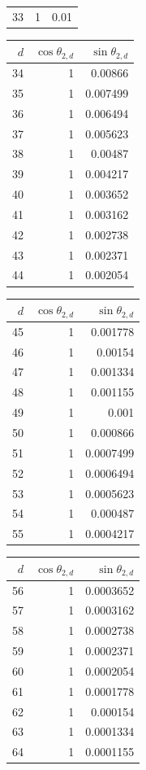 {\begin{tabular}[t]{r|rr}
33 & 1 & 0.01
\end{tabular}\kern4pt
\begin{tabular}[t]{r|rr}
$d$ & $\cos\theta_{2,d}$ & $\sin\theta_{2,d}$ \\\hline
34 & 1 & 0.00866 \\
35 & 1 & 0.007499 \\
36 & 1 & 0.006494 \\
37 & 1 & 0.005623 \\
38 & 1 & 0.00487 \\
39 & 1 & 0.004217 \\
40 & 1 & 0.003652 \\
41 & 1 & 0.003162 \\
42 & 1 & 0.002738 \\
43 & 1 & 0.002371 \\
44 & 1 & 0.002054
\end{tabular}\kern4pt
\begin{tabular}[t]{r|rr}
$d$ & $\cos\theta_{2,d}$ & $\sin\theta_{2,d}$ \\\hline
45 & 1 & 0.001778 \\
46 & 1 & 0.00154 \\
47 & 1 & 0.001334 \\
48 & 1 & 0.001155 \\
49 & 1 & 0.001 \\
50 & 1 & 0.000866 \\
51 & 1 & 0.0007499 \\
52 & 1 & 0.0006494 \\
53 & 1 & 0.0005623 \\
54 & 1 & 0.000487 \\
55 & 1 & 0.0004217
\end{tabular}\kern4pt
\begin{tabular}[t]{r|rr}
$d$ & $\cos\theta_{2,d}$ & $\sin\theta_{2,d}$ \\\hline
56 & 1 & 0.0003652 \\
57 & 1 & 0.0003162 \\
58 & 1 & 0.0002738 \\
59 & 1 & 0.0002371 \\
60 & 1 & 0.0002054 \\
61 & 1 & 0.0001778 \\
62 & 1 & 0.000154 \\
63 & 1 & 0.0001334 \\
64 & 1 & 0.0001155
\end{tabular}}

